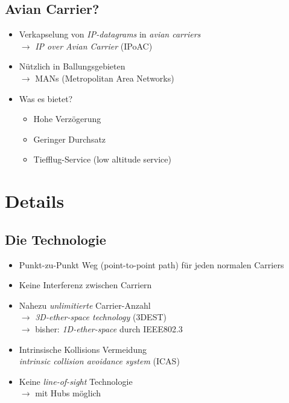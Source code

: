 \documentclass{beamer}
\begin{document}
	\subsection{Avian Carrier?}
	\begin{frame}
		\begin{itemize}
			\item Verkapselung von \textit{IP-datagrams} in \textit{avian carriers}\\
				$\rightarrow$ \textit{IP over Avian Carrier} (IPoAC)
			\item Nützlich in Ballungsgebieten\\
				$\rightarrow$ MANs (Metropolitan Area Networks) 
			\item Was es bietet? 
			\begin{itemize}
				\item Hohe Verzögerung 
				\item Geringer Durchsatz 
				\item Tiefflug-Service (low altitude service)
			\end{itemize}
		\end{itemize}
	\end{frame}
	\section{Details}
	\subsection{Die Technologie}
	\begin{frame}
		\begin{itemize}
			\item Punkt-zu-Punkt Weg (point-to-point path) für jeden normalen Carriers 
			\item Keine Interferenz zwischen Carriern 
			\item Nahezu \textit{unlimitierte} Carrier-Anzahl\\
				$\rightarrow$ \textit{3D-ether-space technology} (3DEST)\\
				$\rightarrow$ bisher: \textit{1D-ether-space} durch IEEE802.3 
			\item Intrinsische Kollisions Vermeidung\\
				\textit{intrinsic collision avoidance system} (ICAS) 
			\item Keine \textit{line-of-sight} Technologie\\
				$\rightarrow$ mit Hubs möglich
		\end{itemize}
	\end{frame}
\end{document}
